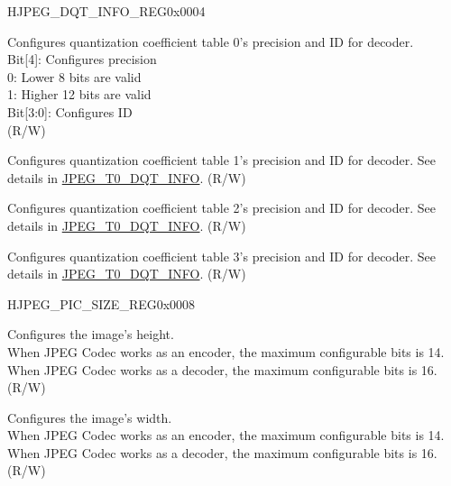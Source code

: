 \begin{register}{H}{JPEG\_DQT\_INFO\_REG}{0x0004}\label{regdesc:JPEGDQTINFOREG}
%
%
%
%
\regnewline%
\begin{regdesc}\begin{reglist}
\label{fielddesc:JPEGT0DQTINFO}\item [JPEG\_T0\_DQT\_INFO] Configures quantization coefficient table 0's precision and ID for decoder.\\
Bit[4]: Configures precision\\
0: Lower 8 bits are valid\\
1: Higher 12 bits are valid\\
Bit[3:0]: Configures ID\\
(R/W)
\label{fielddesc:JPEGT1DQTINFO}\item [JPEG\_T1\_DQT\_INFO] Configures quantization coefficient table 1's precision and ID for decoder. See details in \hyperref[fielddesc:JPEGT0DQTINFO]{JPEG\_T0\_DQT\_INFO}. (R/W)
\label{fielddesc:JPEGT2DQTINFO}\item [JPEG\_T2\_DQT\_INFO] Configures quantization coefficient table 2's precision and ID for decoder. See details in \hyperref[fielddesc:JPEGT0DQTINFO]{JPEG\_T0\_DQT\_INFO}. (R/W)
\label{fielddesc:JPEGT3DQTINFO}\item [JPEG\_T3\_DQT\_INFO] Configures quantization coefficient table 3's precision and ID for decoder. See details in \hyperref[fielddesc:JPEGT0DQTINFO]{JPEG\_T0\_DQT\_INFO}. (R/W)
\end{reglist}\end{regdesc}
\end{register}


\begin{register}{H}{JPEG\_PIC\_SIZE\_REG}{0x0008}\label{regdesc:JPEGPICSIZEREG}
%
%
\regnewline%
\begin{regdesc}\begin{reglist}
\label{fielddesc:JPEGVA}\item [JPEG\_VA] Configures the image's height. \\
When JPEG Codec works as an encoder, the maximum configurable bits is 14.\\
When JPEG Codec works as a decoder, the maximum configurable bits is 16.\\
 (R/W)
\label{fielddesc:JPEGHA}\item [JPEG\_HA] Configures the image's width. \\
When JPEG Codec works as an encoder, the maximum configurable bits is 14.\\
When JPEG Codec works as a decoder, the maximum configurable bits is 16.\\
 (R/W)
\end{reglist}\end{regdesc}
\end{register}


